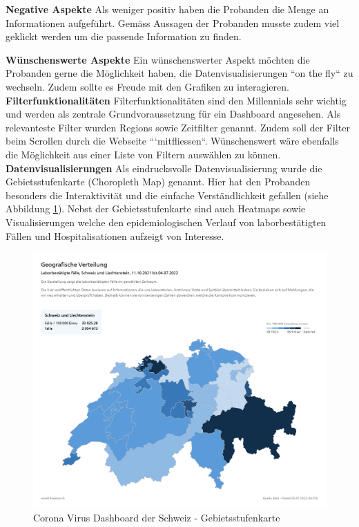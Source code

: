\noindent
\textbf{Negative Aspekte}
\newline
\indent
Als weniger positiv haben die Probanden die Menge an Informationen aufgeführt. Gemäss Aussagen der Probanden musste zudem viel geklickt werden um die passende Information zu finden.

\clearpage
\noindent
\textbf{Wünschenswerte Aspekte}
\newline
\indent
Ein wünschenswerter Aspekt möchten die Probanden gerne die Möglichkeit haben, die Datenvisualisierungen ``on the fly`` zu wechseln. Zudem sollte es Freude mit den Grafiken zu interagieren.\\

\noindent
\textbf{Filterfunktionalitäten}
\newline
\indent
Filterfunktionalitäten sind den Millennials sehr wichtig und werden als zentrale Grundvoraussetzung für ein Dashboard angesehen. Als relevanteste Filter wurden Regions sowie Zeitfilter genannt. Zudem soll der Filter beim Scrollen durch die Webseite ```mitfliessen``. Wünschenswert wäre ebenfalls die Möglichkeit aus einer Liste von Filtern auswählen zu können.\\

\noindent
\textbf{Datenvisualisierungen}
\newline
\indent
Als eindrucksvolle Datenvisualisierung wurde die Gebietsstufenkarte (Choropleth Map) genannt. Hier hat den Probanden besonders die Interaktivität und die einfache Verständlichkeit gefallen (siehe Abbildung \ref{fig:covid_dashboard_switzerland_choropleth_map}). Nebst der Gebietsstufenkarte sind auch Heatmaps sowie Visualisierungen welche den epidemiologischen Verlauf von laborbestätigten Fällen und Hospitalisationen aufzeigt von Interesse.

\begin{figure}[h]
    \includegraphics[width=12cm]{images/covid_dashboard_switzerland_choropleth_map.png}
    \centering
    \caption{Corona Virus Dashboard der Schweiz - Gebietsstufenkarte ~\citep{corona_dashboard_switzerland}}
    \label{fig:covid_dashboard_switzerland_choropleth_map}
\end{figure}

